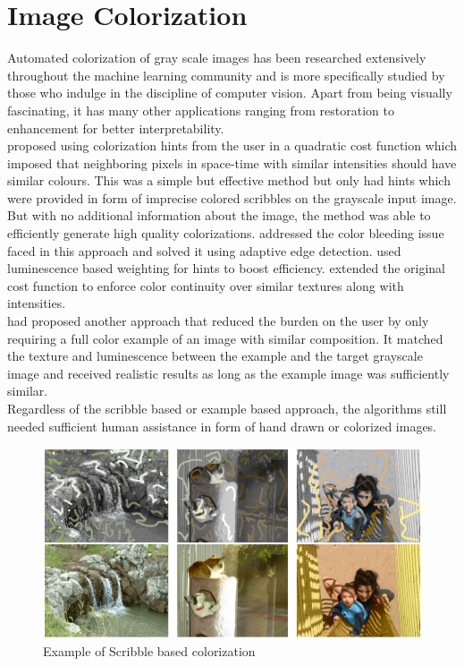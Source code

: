 \documentclass[12pt, letterpaper]{article}
\begin{document}
	\section{Image Colorization}
		\hspace*{0.25 in} Automated colorization of gray scale images has been researched extensively throughout the machine learning community and is more specifically studied by those who indulge in the discipline of computer vision. Apart from being visually fascinating, it has many other applications ranging from restoration to enhancement for better interpretability.\\
		\hspace*{0.25 in}\cite{levin2004colorization} proposed using colorization hints from the user in a quadratic cost function which imposed that neighboring pixels in space-time with similar intensities should have similar colours. This was a simple but effective method but only had hints which were provided in form of imprecise colored scribbles on the grayscale input image. But with no additional information about the image, the method was able to efficiently generate high quality colorizations. \cite{huang2005edge} addressed the color bleeding issue faced in this approach and solved it using adaptive edge detection. \cite{yatziv2006chrominance} used luminescence based weighting for hints to boost efficiency. \cite{qu2006manga} extended the original cost function to enforce color continuity over similar textures along with intensities.\\
		\hspace*{0.25 in}\cite{welsh2002color} had proposed another approach that reduced the burden on the user by only requiring a full color example of an image with similar composition. It matched the texture and luminescence between the example and the target grayscale image and received realistic results as long as the example image was sufficiently similar.\\
		\hspace*{0.25 in}Regardless of the scribble based or example based approach, the algorithms still needed sufficient human assistance in form of hand drawn or colorized images. 
		\begin{figure}
		\includegraphics[width=\textwidth]{levin_scribble_based_colorization_example.jpg}
		\caption{Example of Scribble based colorization \citep{levin2004colorization}}
		\label{fig: levin_example}
		\end{figure}
\end{document}
